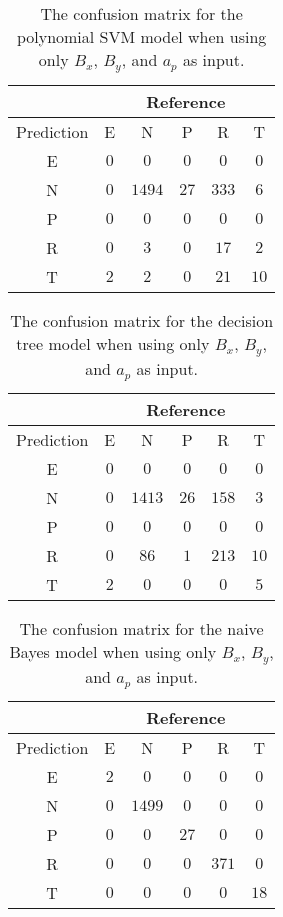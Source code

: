 \begin{table}[!ht]
	\centering
	\begin{tabular}{|c|c|c|c|c|c|}
		\hline
		 & \multicolumn{5}{|c|}{Reference} \\ \hline
		 Prediction & E & N & P & R & T \\ \hline
		 E & $0$ & $0$ & $0$ & $0$ & $0$ \\ \hline
		 N & $0$ & $1494$ & $27$ & $333$ & $6$ \\ \hline
		 P & $0$ & $0$ & $0$ & $0$ & $0$ \\ \hline
		 R & $0$ & $3$ & $0$ & $17$ & $2$ \\ \hline
		 T & $2$ & $2$ & $0$ & $21$ & $10$ \\ \hline
	\end{tabular}
	\caption{The confusion matrix for the polynomial SVM model when using only $B_{x}$, $B_{y}$, and $a_{p}$ as input.}
	\label{tab:cm:xyap:svmPoly}
\end{table}

\begin{table}[!ht]
	\centering
	\begin{tabular}{|c|c|c|c|c|c|}
		\hline
		 & \multicolumn{5}{|c|}{Reference} \\ \hline
		 Prediction & E & N & P & R & T \\ \hline
		 E & $0$ & $0$ & $0$ & $0$ & $0$ \\ \hline
		 N & $0$ & $1413$ & $26$ & $158$ & $3$ \\ \hline
		 P & $0$ & $0$ & $0$ & $0$ & $0$ \\ \hline
		 R & $0$ & $86$ & $1$ & $213$ & $10$ \\ \hline
		 T & $2$ & $0$ & $0$ & $0$ & $5$ \\ \hline
	\end{tabular}
	\caption{The confusion matrix for the decision tree model when using only $B_{x}$, $B_{y}$, and $a_{p}$ as input.}
	\label{tab:cm:xyap:C5.0}
\end{table}

\begin{table}[!ht]
	\centering
	\begin{tabular}{|c|c|c|c|c|c|}
		\hline
		 & \multicolumn{5}{|c|}{Reference} \\ \hline
		 Prediction & E & N & P & R & T \\ \hline
		 E & $2$ & $0$ & $0$ & $0$ & $0$ \\ \hline
		 N & $0$ & $1499$ & $0$ & $0$ & $0$ \\ \hline
		 P & $0$ & $0$ & $27$ & $0$ & $0$ \\ \hline
		 R & $0$ & $0$ & $0$ & $371$ & $0$ \\ \hline
		 T & $0$ & $0$ & $0$ & $0$ & $18$ \\ \hline
	\end{tabular}
	\caption{The confusion matrix for the naive Bayes model when using only $B_{x}$, $B_{y}$, and $a_{p}$ as input.}
	\label{tab:cm:xyap:nb}
\end{table}


